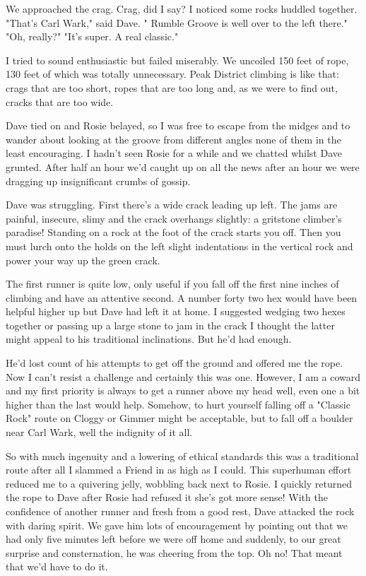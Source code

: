 \documentclass[a5paper,openany,font 10pt]{scrbook}
\begin{document}
We approached the crag. Crag, did I say? I noticed some
rocks huddled together.
"That's Carl Wark," said Dave. " Rumble Groove  is well over
to the left there."
"Oh, really?"
"It's super. A real classic."

I tried to sound enthusiastic but failed miserably. We
uncoiled 150 feet of rope, 130 feet of which was totally
unnecessary. Peak District climbing is like that: crags that are
too short, ropes that are too long and, as we were to find out,
cracks that are too wide.

Dave tied on and Rosie belayed, so I was free to escape from
the midges and to wander about looking at the groove from
different angles   none of them in the least encouraging. I
hadn't seen Rosie for a while and we chatted whilst Dave grunted.
After half an hour we'd caught up on all the news  after an hour
we were dragging up insignificant crumbs of gossip.

Dave was struggling. First there's a wide crack leading up
left. The jams are painful, insecure, slimy and the crack
overhangs slightly: a gritstone climber's paradise! Standing on a
rock at the foot of the crack starts you off. Then you must lurch
onto the holds on the left  slight indentations in the vertical
rock  and power your way up the green crack.

The first runner is quite low, only useful if you fall off
the first nine inches of climbing and have an attentive second. A
number forty two hex would have been helpful higher up but Dave
had left it at home. I suggested wedging two hexes together or
passing up a large stone to jam in the crack  I thought the
latter might appeal to his traditional inclinations. But he'd had
enough.

He'd lost count of his attempts to get off the ground and
offered me the rope. Now I can't resist a challenge and certainly
this was one. However, I am a coward and my first priority is
always to get a runner above my head   well, even one a bit
higher than the last would help. Somehow, to hurt yourself
falling off a "Classic Rock" route on Cloggy or Gimmer might be
acceptable, but to fall off a boulder near Carl Wark, well the
indignity  of it all.

So with much ingenuity and a lowering of ethical standards
 this was a traditional route after all  I slammed a Friend in as
high as I could. This superhuman effort reduced me to a quivering
jelly, wobbling back next to Rosie. I quickly returned the rope
to Dave after Rosie had refused it   she's got more sense!
With the confidence of another runner and fresh from a good
rest, Dave attacked the rock with daring spirit. We gave him lots
of encouragement by pointing out that we had only five minutes
left before we were off home and suddenly, to our great surprise
and consternation, he was cheering from the top. Oh no! That
meant that we'd have to do it.
\end{document}
